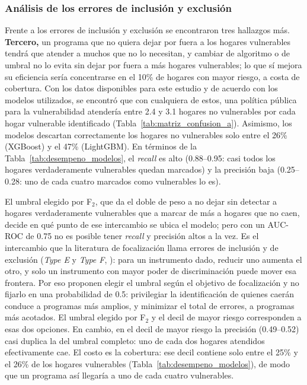 \documentclass[12pt, letterpaper]{article}
\begin{document}
\subsubsection{Análisis de los errores de inclusión y exclusión}
\label{subsec:errores_inclusion}

Frente a los errores de inclusión y exclusión se encontraron tres
hallazgos más. \textbf{Tercero,} un programa que no quiera dejar por fuera a los hogares
vulnerables tendrá que atender a muchos que no lo necesitan, y cambiar de
algoritmo o de umbral no lo evita sin dejar por fuera a más hogares
vulnerables; lo que sí mejora su eficiencia sería concentrarse en el 10\%
de hogares con mayor riesgo, a costa de cobertura. Con los datos disponibles
para este estudio y de acuerdo con los modelos utilizados, se encontró que con
cualquiera de estos, una política pública para la vulnerabilidad
atendería entre 2.4 y 3.1 hogares no vulnerables por cada hogar vulnerable
identificado (Tabla~\ref{tab:matriz_confusion_a}). Asimismo, 
los modelos descartan correctamente los hogares no vulnerables solo entre el
26\% (XGBoost) y el 47\% (LightGBM). En términos de la
Tabla~\ref{tab:desempeno_modelos}, el \emph{recall} es alto (0.88--0.95:
casi todos los hogares verdaderamente vulnerables quedan marcados) y la precisión baja
(0.25--0.28: uno de cada cuatro marcados como vulnerables lo es).

El umbral elegido por
F$_2$, que da el doble de peso a no dejar sin detectar a hogares verdaderamente 
vulnerables que a marcar de más a hogares que no caen, decide en qué punto
de ese intercambio se ubica el modelo; pero con un AUC-ROC de 0.75 no es
posible tener \emph{recall} y precisión altos a la vez. Es el intercambio
que la literatura de focalización llama errores de inclusión y de
exclusión (\emph{Type E} y \emph{Type F}, \textcite{cornia1993}): para un
instrumento dado, reducir uno aumenta el otro, y solo un instrumento con
mayor poder de discriminación puede mover esa frontera. Por eso
\textcite{hohberg2018} proponen elegir el umbral según el objetivo de
focalización y no fijarlo en una probabilidad de 0.5: privilegiar la
identificación de quienes caerán conduce a programas más amplios, y
minimizar el total de errores, a programas más acotados. El umbral elegido
por F$_2$ y el decil de mayor riesgo corresponden a esas dos opciones. En cambio, en el
decil de mayor riesgo la precisión (0.49--0.52) casi duplica la del umbral
completo: uno de cada dos hogares atendidos efectivamente cae. El costo
es la cobertura: ese decil contiene solo entre el 25\% y el 26\% de los
hogares vulnerables (Tabla~\ref{tab:desempeno_modelos}), de
modo que un programa así llegaría a uno de cada cuatro vulnerables.
\end{document}
